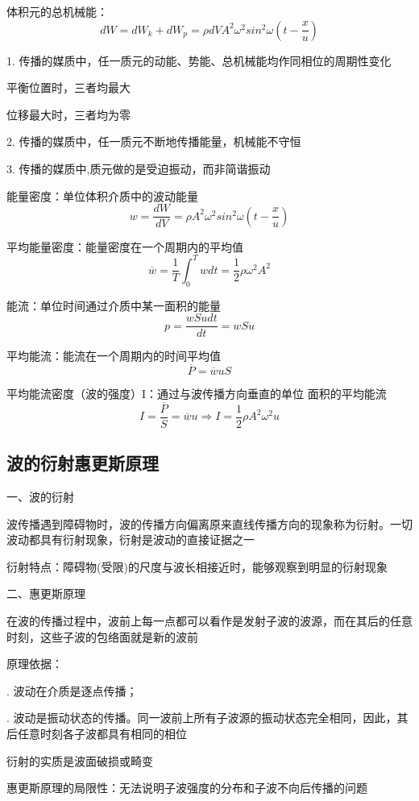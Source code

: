 \documentclass[UTF8]{article}
\begin{document}
    体积元的总机械能：
    \[dW = dW_k + dW_p = \rho dVA^2\omega^2sin^2\omega(t - \frac{x}{u})\]

    1. 传播的媒质中，任一质元的动能、势能、总机械能均作同相位的周期性变化

    \;\;平衡位置时，三者均最大

    \;\;位移最大时，三者均为零

    2. 传播的媒质中，任一质元不断地传播能量，机械能不守恒

    3. 传播的媒质中,质元做的是受迫振动，而非简谐振动

    能量密度：单位体积介质中的波动能量
    \[w = \frac{dW}{dV} = \rho A^2\omega^2sin^2\omega(t - \frac{x}{u})\]

    平均能量密度：能量密度在一个周期内的平均值
    \[\overline{w} = \frac{1}{T}\int_0^Twdt = \frac{1}{2}\rho\omega^2 A^2\]

    能流：单位时间通过介质中某一面积的能量
    \[p = \frac{wSudt}{dt} = wSu\]

    平均能流：能流在一个周期内的时间平均值
    \[\overline{P} = \overline{w}uS\]

    平均能流密度（波的强度）I：通过与波传播方向垂直的单位
    面积的平均能流
    \[I = \frac{\overline{P}}{S} = \overline{w}u\Rightarrow I = \frac{1}{2}\rho A^2\omega^2u\]

\subsection{波的衍射\;\;惠更斯原理}

    一、波的衍射

    波传播遇到障碍物时，波的传播方向偏离原来直线传播方向的现象称为衍射。一切波动都具有衍射现象，衍射是波动的直接证据之一

    衍射特点：障碍物(受限)的尺度与波长相接近时，能够观察到明显的衍射现象

    二、惠更斯原理

    在波的传播过程中，波前上每一点都可以看作是发射子波的波源，而在其后的任意时刻，这些子波的包络面就是新的波前

    原理依据： 
    
    \;. 波动在介质是逐点传播；

    \;. 波动是振动状态的传播。同一波前上所有子波源的振动状态完全相同，因此，其后任意时刻各子波都具有相同的相位  

    衍射的实质是波面破损或畸变

    惠更斯原理的局限性：无法说明子波强度的分布和子波不向后传播的问题
\end{document}
